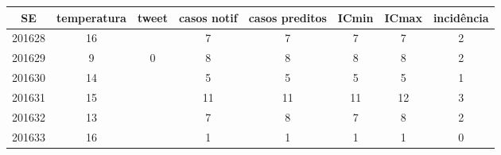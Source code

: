 \begin{tabular}{c|ccccccc}
  \hline
SE & temperatura & tweet & casos notif & casos preditos & ICmin & ICmax & incidência \\ 
  \hline
201628 & 16 &  & 7 & 7 & 7 & 7 & 2 \\ 
  201629 & 9 & 0 & 8 & 8 & 8 & 8 & 2 \\ 
  201630 & 14 &  & 5 & 5 & 5 & 5 & 1 \\ 
  201631 & 15 &  & 11 & 11 & 11 & 12 & 3 \\ 
  201632 & 13 &  & 7 & 8 & 7 & 8 & 2 \\ 
  201633 & 16 &  & 1 & 1 & 1 & 1 & 0 \\ 
   \hline
\end{tabular}
